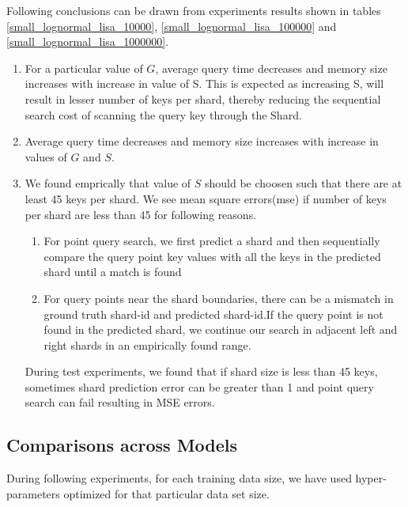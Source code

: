 \begin{mscconclusion}
	Following conclusions can be drawn from experiments results shown in tables \ref{small_lognormal_lisa_10000}, \ref{small_lognormal_lisa_100000} and \ref{small_lognormal_lisa_1000000}. 
\begin{enumerate}

    \item For a particular value of $G$, average query time decreases and memory size increases with increase in value of S. This is expected as increasing S, will result in lesser number of keys per shard, thereby reducing the sequential search cost of scanning the query key through the Shard. 
    
    \item Average query time decreases and memory size increases with increase in values of $G$ and $S$. 
	
	\item We found emprically that value of $S$ should be choosen such that there are at least 45 keys per shard. We see mean square errors(mse) if number of keys per shard are less than 45 for following reasons. 
	\begin{enumerate}
	    \item For point query search, we first predict a shard and then sequentially compare the query point key values with all the keys in the predicted shard until a match is found
		\item For query points near the shard boundaries, there can be a mismatch in ground truth shard-id and predicted shard-id.If the query point is not found in the predicted shard, we continue our search in adjacent left and right shards in an empirically found range.
	\end{enumerate}
	
	During test experiments, we found that if shard size is less than 45 keys, sometimes shard prediction error can be greater than 1 and point query search can fail resulting in MSE errors.  
\end{enumerate}
\end{mscconclusion}

\subsection{Comparisons across Models}

During following experiments, for each training data size, we have used hyper-parameters optimized for that particular data set size. 

